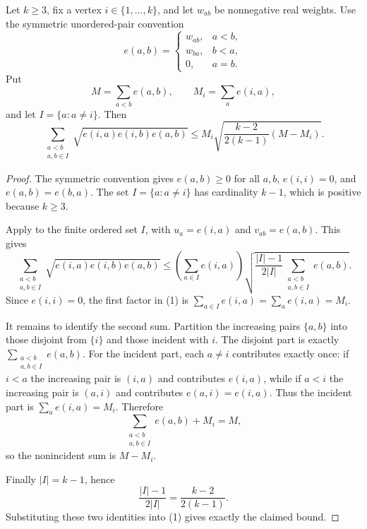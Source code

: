 \begin{helper}
Let $k\ge 3$, fix a vertex $i\in\{1,\ldots,k\}$, and let $w_{ab}$ be
nonnegative real weights.  Use the symmetric unordered-pair convention
\[
e(a,b)=
\begin{cases}
w_{ab},&a<b,\\
w_{ba},&b<a,\\
0,&a=b.
\end{cases}
\]
Put
\[
M=\sum_{a<b} e(a,b),\qquad
M_i=\sum_a e(i,a),
\]
and let $I=\{a:a\ne i\}$.  Then
\[
\sum_{\substack{a<b\\a,b\in I}}
\sqrt{e(i,a)e(i,b)e(a,b)}
\le
M_i\sqrt{\frac{k-2}{2(k-1)}(M-M_i)}.
\]
\end{helper}
\begin{proof}
The symmetric convention gives $e(a,b)\ge 0$ for all $a,b$, $e(i,i)=0$,
and $e(a,b)=e(b,a)$.  The set $I=\{a:a\ne i\}$ has cardinality $k-1$,
which is positive because $k\ge 3$.

Apply  to the finite ordered
set $I$, with $u_a=e(i,a)$ and $v_{ab}=e(a,b)$.  This gives
\[
\sum_{\substack{a<b\\a,b\in I}}\sqrt{e(i,a)e(i,b)e(a,b)}
\le
\left(\sum_{a\in I} e(i,a)\right)
\sqrt{\frac{|I|-1}{2|I|}
\sum_{\substack{a<b\\a,b\in I}}e(a,b)}. \tag{1}
\]
Since $e(i,i)=0$, the first factor in (1) is
$\sum_{a\in I}e(i,a)=\sum_a e(i,a)=M_i$.

It remains to identify the second sum.  Partition the increasing pairs
$\{a,b\}$ into those disjoint from $\{i\}$ and those incident with $i$.
The disjoint part is exactly
$\sum_{\substack{a<b\\a,b\in I}}e(a,b)$.  For the incident part, each
$a\ne i$ contributes exactly once: if $i<a$ the increasing pair is
$(i,a)$ and contributes $e(i,a)$, while if $a<i$ the increasing pair is
$(a,i)$ and contributes $e(a,i)=e(i,a)$.  Thus the incident part is
$\sum_a e(i,a)=M_i$.  Therefore
\[
\sum_{\substack{a<b\\a,b\in I}}e(a,b)+M_i=M,
\]
so the nonincident sum is $M-M_i$.

Finally $|I|=k-1$, hence
\[
\frac{|I|-1}{2|I|}=\frac{k-2}{2(k-1)}.
\]
Substituting these two identities into (1) gives exactly the claimed
bound.
\end{proof}

